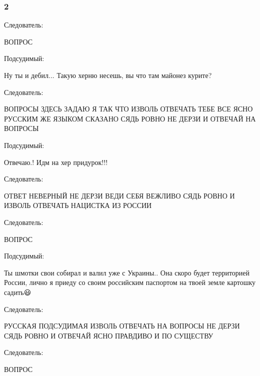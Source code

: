  
 
 
 
 

\subsubsection{2}

Следователь:

ВОПРОС

Подсудимый:

Ну ты и дебил...
Такую херню несешь, вы что там майонез курите?

Следователь:

ВОПРОСЫ ЗДЕСЬ ЗАДАЮ Я ТАК ЧТО ИЗВОЛЬ ОТВЕЧАТЬ ТЕБЕ ВСЕ ЯСНО РУССКИМ ЖЕ ЯЗЫКОМ
СКАЗАНО СЯДЬ РОВНО НЕ ДЕРЗИ И ОТВЕЧАЙ НА ВОПРОСЫ

Подсудимый:

Отвечаю.! Идм на хер придурок!!!

Следователь:

ОТВЕТ НЕВЕРНЫЙ НЕ ДЕРЗИ ВЕДИ СЕБЯ ВЕЖЛИВО СЯДЬ РОВНО И ИЗВОЛЬ ОТВЕЧАТЬ НАЦИСТКА
ИЗ РОССИИ

Следователь:

ВОПРОС

Подсудимый:

Ты шмотки свои собирал и валил уже с Украины.. Она скоро будет территорией
России, лично я приеду со своим российским паспортом на твоей земле картошку
садить😃

Следователь:

РУССКАЯ ПОДСУДИМАЯ ИЗВОЛЬ ОТВЕЧАТЬ НА ВОПРОСЫ НЕ ДЕРЗИ СЯДЬ РОВНО И ОТВЕЧАЙ
ЯСНО ПРАВДИВО И ПО СУЩЕСТВУ

Следователь:

ВОПРОС


